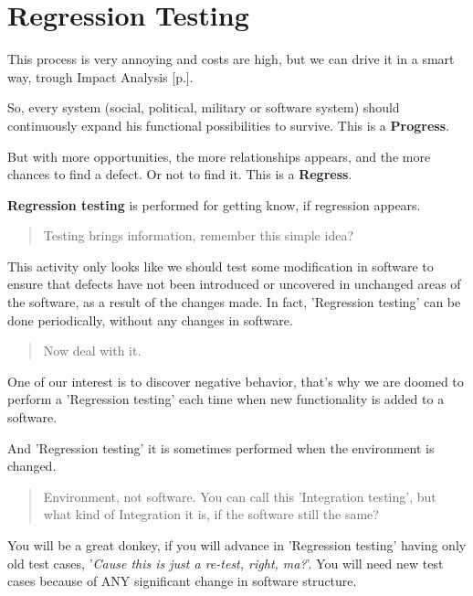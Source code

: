 \section{Regression Testing}
\label{sec:Regression Testing}

This process is very annoying and costs are high, but we can drive it in a smart way, trough Impact Analysis [p.\pageref{sec:Impact Analysis}].

So, every system (social, political, military or software system) should continuously expand his functional possibilities to survive. This is a \textbf{Progress}.

But with more opportunities, the more relationships appears, and the more chances to find a defect. Or not to find it. This is a \textbf{Regress}.

\textbf{Regression testing} is performed for getting know, if regression appears.

\begin{quote}
 Testing brings information, remember this simple idea?
 \end{quote} 

This activity only looks like we should test some modification in software to ensure that defects have not been introduced or uncovered in unchanged areas of the software, as a result of the changes made. In fact, 'Regression testing' can be done periodically, without any changes in software. 

\begin{quote}
Now deal with it.\end{quote} 

One of our interest is to discover negative behavior, that's why we are doomed to perform a 'Regression testing' each time when new functionality is added to a software.

And 'Regression testing' it is sometimes performed when the environment is changed.

\begin{quote}
 Environment, not software. You can call this 'Integration testing', but what kind of Integration it is, if the software still the same?
\end{quote} 

You will be a great donkey, if you will advance in 'Regression testing' having only old test cases, '\textit{Cause this is just a re-test, right, ma?}'. You will need new test cases because of ANY significant change in software structure.
